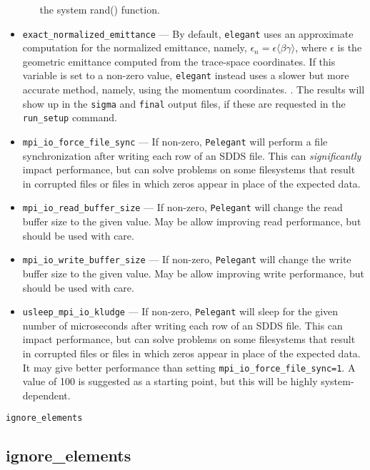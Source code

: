 \documentclass[11pt]{article}
\begin{document}
\begin{itemize}
\begin{itemize}
      the system rand() function.
    \end{itemize}
\item \verb|exact_normalized_emittance| --- By default, \verb|elegant| uses an approximate computation for the normalized emittance, namely,
$\epsilon_n = \epsilon\langle\beta\gamma\rangle$, where $\epsilon$ is the geometric emittance computed from the trace-space coordinates.
If this variable is set to a non-zero value, \verb|elegant| instead uses a slower but more accurate method, namely, using the momentum coordinates.
\cite{Floettmann-PRSTAB6-034202}. The results will show up in the \verb|sigma| and \verb|final| output files, if these are requested in the \verb|run_setup| command.
\item \verb|mpi_io_force_file_sync|  --- If non-zero, \verb|Pelegant| will perform a file synchronization after writing each row of
  an SDDS file. This can {\em significantly} impact performance, but can solve problems on some filesystems that result in corrupted files
  or files in which zeros appear in place of the expected data.
\item \verb|mpi_io_read_buffer_size|  --- If non-zero, \verb|Pelegant| will change the read buffer size to the given value. 
  May be allow improving read performance, but should be used with care.
\item \verb|mpi_io_write_buffer_size|  --- If non-zero, \verb|Pelegant| will change the write buffer size to the given value. 
  May be allow improving write performance, but should be used with care.
\item \verb|usleep_mpi_io_kludge|  --- If non-zero, \verb|Pelegant| will sleep for the given number of microseconds after
  writing each row of an SDDS file. This can impact performance, but can solve problems on some filesystems that result in corrupted files
  or files in which zeros appear in place of the expected data.
  It may give better performance than setting \verb|mpi_io_force_file_sync=1|.
  A value of 100 is suggested as a starting point, but this will be highly system-dependent.
\end{itemize}


\newpage
\begin{center}{\Large\verb|ignore_elements|}\end{center}
\subsection{ignore\_elements \label{subsec:ignoreelements}}
\end{document}
